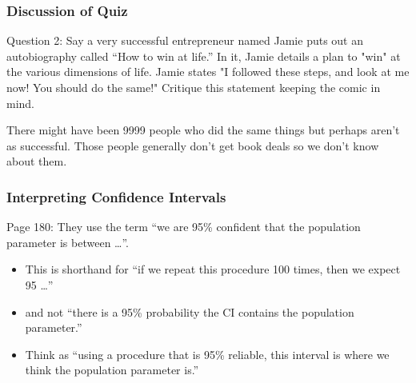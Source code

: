 \documentclass[handout]{beamer}
\newcommand{\blue}[1]{\textcolor{blue2}{#1}}
\begin{document}
\begin{frame}[fragile]
\frametitle{Discussion of Quiz}
\blue{Question 2}:  Say a very successful entrepreneur named Jamie puts out an autobiography called ``How to win at life.''  In it, Jamie details a plan to "win" at the various dimensions of life.  Jamie states "I followed these steps, and look at me now!  You should do the same!"  Critique this statement keeping the comic in mind. 

\vspace{0.25cm}

\pause There might have been 9999 people who did the same things but perhaps aren't as successful.  Those people generally don't get book deals so we don't know about them.

\end{frame}


\begin{frame}[fragile]
\frametitle{Interpreting Confidence Intervals}

Page 180: They use the term ``we are \blue{95\% confident} that the population parameter is between \ldots''.

\begin{itemize}
\pause\item This is shorthand for ``if we repeat this procedure 100 times, then we expect 95 \ldots''
\pause\item and not ``there is a 95\% probability the CI contains the population parameter.''
\pause\item Think as ``using a procedure that is 95\% reliable, this interval is where we think the population parameter is.''
\end{itemize}

\end{frame}
\end{document}
